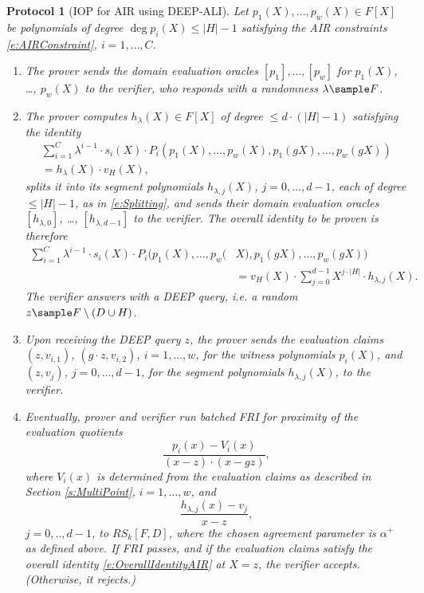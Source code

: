 \documentclass[11pt,article,oneside]{memoir}
\newtheorem{protocol}[]{Protocol}
\theoremstyle{definition}
\theoremstyle{remark}
\DeclareMathOperator{\Quotient}{\mathsf{Quotient}}
\begin{document}
\begin{protocol}[IOP for AIR using DEEP-ALI]
\label{p:AIRDEEP}
Let $p_1(X), \ldots, p_w(X)\in F[X]$ be polynomials of degree $\deg p_i(X)\leq |H|-1$ satisfying the AIR constraints \eqref{e:AIRConstraint}, $i=1,\ldots, C$.
\begin{enumerate}
\item
The prover sends the domain evaluation oracles  $[p_1], \ldots, [p_w]$ for $p_1(X)$, \ldots, $p_w(X)$ to the verifier, who responds with a randomness $\lambda\sample F$.
%
\item 
The prover computes $h_\lambda(X)\in F[X]$ of degree $\leq d \cdot (|H|-1)$ satisfying the identity
\begin{multline*}
\sum_{i=1}^{C} \lambda^{i-1}\cdot s_i(X)\cdot P_i(p_1(X),\ldots ,p_w(X),p_1(gX), \ldots, p_w(gX)) 
\\ 
= h_\lambda(X)\cdot v_H(X),
\end{multline*}
splits it into its segment polynomials $h_{\lambda, j}(X)$, $j=0,\ldots, d-1$, each of degree $\leq |H|-1$, as in \eqref{e:Splitting}, and sends their domain evaluation oracles $[h_{\lambda,0}]$, \ldots, $[h_{\lambda,d - 1}]$ to the verifier.  
The overall identity to be proven is therefore
\begin{equation}
\label{e:OverallIdentityAIR}
\begin{aligned}
\sum_{i=1}^{C} \lambda^{i-1}\cdot s_i(X)\cdot P_i(p_1(X), \ldots, p_w(&X), p_1(gX), \ldots, p_w(gX))
\\ 
&= v_H(X)\cdot \sum_{j=0}^{d-1} X^{j\cdot |H|}\cdot  h_{\lambda,j}(X).
\end{aligned}
\end{equation}
The verifier answers with a DEEP query, i.e. a random $z\sample F\setminus (D\cup H)$.
%
\item 
Upon receiving the DEEP query $z$, the prover sends the evaluation claims $(z,v_{i,1})$, $(g\cdot z, v_{i,2})$, $i=1,...,w$, for the witness polynomials $p_i(X)$, and $(z,v_j)$, $j=0,...,d-1$, for the segment polynomials $h_{\lambda, j}(X)$, to the verifier.
\item
Eventually, prover and verifier run batched FRI for proximity of the evaluation quotients
\begin{equation*}
\frac{p_ i(x)- V_i(x)}{(x-z)\cdot (x-gz)},
\end{equation*}
where $V_i(x)$ is determined from the evaluation claims as described in Section \ref{s:MultiPoint},
 $i=1,\ldots,w$, and
\begin{equation*}
\frac{h_{\lambda,j}(x)-v_j}{x-z}, 
\end{equation*}
$j=0,..,d-1$, to $RS_k[F,D]$, where the chosen agreement parameter is $\alpha^+$ as defined above. 
If FRI passes, and if the evaluation claims satisfy the overall identity \eqref{e:OverallIdentityAIR} at $X=z$, the verifier accepts. 
(Otherwise, it rejects.)
\end{enumerate}
\end{protocol}
\end{document}
